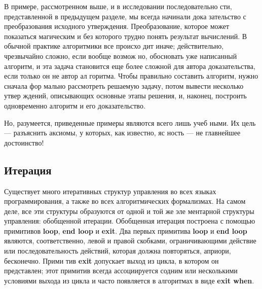 В примере, рассмотренном выше, и в исследовании последовательно­
сти,  представленной в предыдущем  разделе,  мы  всегда начинали  дока­
зательство с преобразования исходного утверждения. Преобразование, 
которое может показаться  магическим  и  без  которого трудно  понять 
результат вычислений. В обычной практике алгоритмики все происхо­
дит  иначе;  действительно,  чрезвычайно  сложно,  если  вообще  возмож­
но, обосновать уже написанный алгоритм, и эта задача становится еще 
более сложной для  автора доказательства, если только он не автор ал­
горитма.  Чтобы  правильно составить  алгоритм,  нужно  сначала фор­
мально рассмотреть решаемую задачу, потом вывести несколько утвер­
ждений, описывающих основные этапы решения, и, наконец, построить 
одновременно алгоритм и его доказательство.
\pagebreak

Но,  разумеется,  приведенные  примеры  являются  всего  лишь  учеб­
ными.  Их  цель  —  разъяснить  аксиомы,  у  которых,  как  известно,  яс­
ность — не  главнейшее  достоинство!
\subsection{Итерация}
\noindent Существует много итеративных структур управления во всех языках 
программирования, а также во всех алгоритмических формализмах. 
На самом деле, все эти структуры образуются от одной и той же эле­
ментарной структуры управления: обобщенной итерации. Обобщенная 
итерация построена с помощью примитивов \textbf{loop},  \textbf{end loop} и \textbf{exit}. Два 
первых примитива \textbf{loop} и \textbf{end loop}  являются, соответственно, левой и 
правой скобками, ограничивающими действие или последовательность 
действий, которая должна повторяться, априори, бесконечно. Прими­
тив \textbf{exit} допускает выход из цикла, в котором он представлен; этот 
примитив  всегда  ассоциируется содним  или  несколькими  условиями 
выхода из цикла и часто появляется в алгоритмах в виде \textbf{exit when}.

